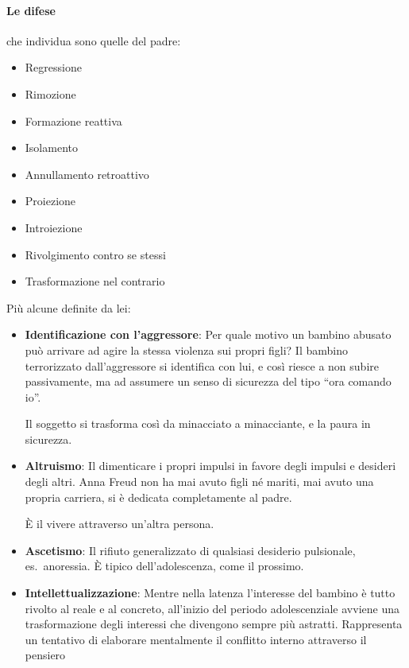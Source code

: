 \documentclass[12pt, a4paper]{article}
\begin{document}
\paragraph{Le difese} che individua sono quelle del padre:

\begin{itemize}
    \item Regressione
    \item Rimozione
    \item Formazione reattiva
    \item Isolamento
    \item Annullamento retroattivo
    \item Proiezione
    \item Introiezione
    \item Rivolgimento contro se stessi
    \item Trasformazione nel contrario
\end{itemize}

Pi\`u alcune definite da lei:

\begin{itemize}
    \item \textbf{Identificazione con l'aggressore}: Per quale motivo un bambino abusato può arrivare ad agire la stessa violenza sui propri figli? Il bambino terrorizzato dall'aggressore si identifica con lui, e cos\`i riesce a non subire passivamente, ma ad assumere un senso di sicurezza del tipo ``ora comando io''. 

        Il soggetto si trasforma cos\`i da minacciato a minacciante, e la paura in sicurezza.
    \item \textbf{Altruismo}: Il dimenticare i propri impulsi in favore degli impulsi e desideri degli altri. Anna Freud non ha mai avuto figli n\'e mariti, mai avuto una propria carriera, si \`e dedicata completamente al padre. 

        \`E il vivere attraverso un'altra persona.
    \item \textbf{Ascetismo}: Il rifiuto generalizzato di qualsiasi desiderio pulsionale, es.\ anoressia. \`E tipico dell'adolescenza, come il prossimo.
    \item \textbf{Intellettualizzazione}: Mentre nella latenza l'interesse del bambino \`e tutto rivolto al reale e al concreto, all'inizio del periodo adolescenziale avviene una trasformazione degli interessi che divengono sempre pi\`u astratti. Rappresenta un tentativo di elaborare mentalmente il conflitto interno attraverso il pensiero
\end{itemize}
\end{document}
